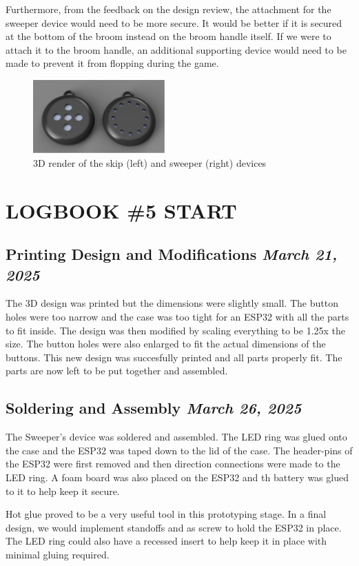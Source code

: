 \documentclass{article}
\newcommand{\logbookentry}[2]{
    \subsection*{#1 \hfill \textit{#2}} 
}
\begin{document}
Furthermore, from the feedback on the design review, the attachment for the sweeper device would need to be more secure. It would be better if it is secured at the bottom of the broom instead on the broom handle itself. If we were to attach it to the broom handle, an additional supporting device would need to be made to prevent it from flopping during the game.
\begin{figure}[ht!]
    \centering
    \includegraphics[width=0.45\textwidth]{design_renders.png}
    \caption{3D render of the skip (left) and sweeper (right) devices}
    \label{fig:3d_render}
\end{figure}

\section{LOGBOOK \#5 START}

\logbookentry{Printing Design and Modifications}{March 21, 2025}

The 3D design was printed but the dimensions were slightly small. The button holes were too narrow and the case was too tight for an ESP32 with all the parts to fit inside. The design was then modified by scaling everything to be 1.25x the size. The button holes were also enlarged to fit the actual dimensions of the buttons. This new design was succesfully printed and all parts properly fit. The parts are now left to be put together and assembled.

\logbookentry{Soldering and Assembly}{March 26, 2025}
The Sweeper's device was soldered and assembled. The LED ring was glued onto the case and the ESP32 was taped down to the lid of the case. The header-pins of the ESP32 were first removed and then direction connections were made to the LED ring. A foam board was also placed on the ESP32 and th battery was glued to it to help keep it secure.

Hot glue proved to be a very useful tool in this prototyping stage. In a final design, we would implement standoffs and as screw to hold the ESP32 in place. The LED ring could also have a recessed insert to help keep it in place with  minimal gluing required.
\end{document}
